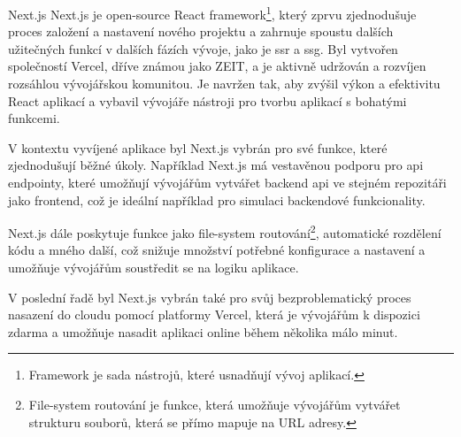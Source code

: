 \begin{subsection}{Next.js}
    \label{subsec:implementace-technologie-nextjs}
    Next.js je open-source React framework\footnote{Framework je sada nástrojů, které usnadňují vývoj aplikací.}, který zprvu zjednodušuje proces založení a nastavení nového projektu a zahrnuje spoustu dalších užitečných funkcí v dalších fázích vývoje, jako je \ac{ssr} a \ac{ssg}.
    Byl vytvořen společností Vercel, dříve známou jako ZEIT, a je aktivně udržován a rozvíjen rozsáhlou vývojářskou komunitou.
    Je navržen tak, aby zvýšil výkon a efektivitu React aplikací a vybavil vývojáře nástroji pro tvorbu aplikací s bohatými funkcemi\cite{n_nextjs_org_docs}.

    V kontextu vyvíjené aplikace byl Next.js vybrán pro své funkce, které zjednodušují běžné úkoly.
    Například Next.js má vestavěnou podporu pro \acs{api} endpointy, které umožňují vývojářům vytvářet backend \acs{api} ve stejném repozitáři jako frontend, což je ideální například pro simulaci backendové funkcionality\cite{n_nextjs_org_docs}.

    Next.js dále poskytuje funkce jako file-system routování\footnote{File-system routování je funkce, která umožňuje vývojářům vytvářet strukturu souborů, která se přímo mapuje na URL adresy.}, automatické rozdělení kódu a mného další, což snižuje množství potřebné konfigurace a nastavení a umožňuje vývojářům soustředit se na logiku aplikace\cite{n_nextjs_org_docs}.

    V poslední řadě byl Next.js vybrán také pro svůj bezproblematický proces nasazení do cloudu pomocí platformy Vercel, která je vývojářům k dispozici zdarma a umožňuje nasadit aplikaci online během několika málo minut\cite{n_nextjs_org_docs}.
\end{subsection}

